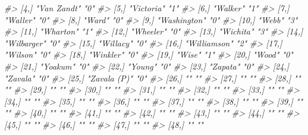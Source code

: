 \documentclass[
]{krantz}
\makeatletter
\newenvironment{Shaded}{\begin{snugshade}}{\end{snugshade}}
\newcommand{\CommentTok}[1]{\textcolor[rgb]{0.37,0.37,0.37}{\textit{#1}}}
\newenvironment{kframe}{%
\medskip{}
\setlength{\fboxsep}{.8em}
 \def\at@end@of@kframe{}%
 \ifinner\ifhmode%
  \def\at@end@of@kframe{\end{minipage}}%
  \begin{minipage}{\columnwidth}%
 \fi\fi%
 \def\FrameCommand##1{\hskip\@totalleftmargin \hskip-\fboxsep
 \colorbox{shadecolor}{##1}\hskip-\fboxsep
     \hskip-\linewidth \hskip-\@totalleftmargin \hskip\columnwidth}%
 \MakeFramed {\advance\hsize-\width
   \@totalleftmargin\z@ \linewidth\hsize
   \@setminipage}}%
 {\par\unskip\endMakeFramed%
 \at@end@of@kframe}
\renewenvironment{Shaded}{\begin{kframe}}{\end{kframe}}
\makeatother
\begin{document}
\begin{Shaded}
\begin{Highlighting}[]
\CommentTok{\#\textgreater{}  [4,] "Van Zandt"     "0"  }
\CommentTok{\#\textgreater{}  [5,] "Victoria"      "1"  }
\CommentTok{\#\textgreater{}  [6,] "Walker"        "1"  }
\CommentTok{\#\textgreater{}  [7,] "Waller"        "0"  }
\CommentTok{\#\textgreater{}  [8,] "Ward"          "0"  }
\CommentTok{\#\textgreater{}  [9,] "Washington"    "0"  }
\CommentTok{\#\textgreater{} [10,] "Webb"          "3"  }
\CommentTok{\#\textgreater{} [11,] "Wharton"       "1"  }
\CommentTok{\#\textgreater{} [12,] "Wheeler"       "0"  }
\CommentTok{\#\textgreater{} [13,] "Wichita"       "3"  }
\CommentTok{\#\textgreater{} [14,] "Wilbarger"     "0"  }
\CommentTok{\#\textgreater{} [15,] "Willacy"       "0"  }
\CommentTok{\#\textgreater{} [16,] "Williamson"    "2"  }
\CommentTok{\#\textgreater{} [17,] "Wilson"        "0"  }
\CommentTok{\#\textgreater{} [18,] "Winkler"       "0"  }
\CommentTok{\#\textgreater{} [19,] "Wise"          "1"  }
\CommentTok{\#\textgreater{} [20,] "Wood"          "0"  }
\CommentTok{\#\textgreater{} [21,] "Yoakum"        "0"  }
\CommentTok{\#\textgreater{} [22,] "Young"         "0"  }
\CommentTok{\#\textgreater{} [23,] "Zapata"        "0"  }
\CommentTok{\#\textgreater{} [24,] "Zavala"        "0"  }
\CommentTok{\#\textgreater{} [25,] "Zavala (P)"    "0"  }
\CommentTok{\#\textgreater{} [26,] ""              ""   }
\CommentTok{\#\textgreater{} [27,] ""              ""   }
\CommentTok{\#\textgreater{} [28,] ""              ""   }
\CommentTok{\#\textgreater{} [29,] ""              ""   }
\CommentTok{\#\textgreater{} [30,] ""              ""   }
\CommentTok{\#\textgreater{} [31,] ""              ""   }
\CommentTok{\#\textgreater{} [32,] ""              ""   }
\CommentTok{\#\textgreater{} [33,] ""              ""   }
\CommentTok{\#\textgreater{} [34,] ""              ""   }
\CommentTok{\#\textgreater{} [35,] ""              ""   }
\CommentTok{\#\textgreater{} [36,] ""              ""   }
\CommentTok{\#\textgreater{} [37,] ""              ""   }
\CommentTok{\#\textgreater{} [38,] ""              ""   }
\CommentTok{\#\textgreater{} [39,] ""              ""   }
\CommentTok{\#\textgreater{} [40,] ""              ""   }
\CommentTok{\#\textgreater{} [41,] ""              ""   }
\CommentTok{\#\textgreater{} [42,] ""              ""   }
\CommentTok{\#\textgreater{} [43,] ""              ""   }
\CommentTok{\#\textgreater{} [44,] ""              ""   }
\CommentTok{\#\textgreater{} [45,] ""              ""   }
\CommentTok{\#\textgreater{} [46,] ""              ""   }
\CommentTok{\#\textgreater{} [47,] ""              ""   }
\CommentTok{\#\textgreater{} [48,] ""              ""   }

\end{Highlighting}
\end{Shaded}
\end{document}
